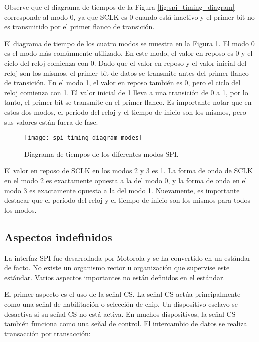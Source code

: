     Observe que el diagrama de tiempos de la Figura \ref{fig:spi_timing_diagram} corresponde al modo 0, ya que SCLK es 0 cuando está inactivo y el primer bit no es transmitido por el primer flanco de transición.

    El diagrama de tiempo de los cuatro modos se muestra en la Figura \ref{fig:spi_timing_diagram_modes}. El modo 0 es el modo más comúnmente utilizado. En este modo, el valor en reposo es 0 y el ciclo del reloj comienza con 0. Dado que el valor en reposo y el valor inicial del reloj son los mismos, el primer bit de datos se transmite antes del primer flanco de transición. En el modo 1, el valor en reposo también es 0, pero el ciclo del reloj comienza con 1. El valor inicial de 1 lleva a una transición de 0 a 1, por lo tanto, el primer bit se transmite en el primer flanco. Es importante notar que en estos dos modos, el período del reloj y el tiempo de inicio son los mismos, pero sus valores están fuera de fase.

    \begin{figure}[!h]
      \centering
      \texttt{[image: spi\_timing\_diagram\_modes]}
      \caption{Diagrama de tiempos de los diferentes modos SPI.}
      \label{fig:spi_timing_diagram_modes}
    \end{figure}

    El valor en reposo de SCLK en los modos 2 y 3 es 1. La forma de onda de SCLK en el modo 2 es exactamente opuesta a la del modo 0, y la forma de onda en el modo 3 es exactamente opuesta a la del modo 1. Nuevamente, es importante destacar que el período del reloj y el tiempo de inicio son los mismos para todos los modos.

    \subsection{Aspectos indefinidos}

    La interfaz SPI fue desarrollada por Motorola y se ha convertido en un estándar de facto. No existe un organismo rector u organización que supervise este estándar. Varios aspectos importantes no están definidos en el estándar.

    El primer aspecto es el uso de la señal CS. La señal CS actúa principalmente como una señal de habilitación o selección de chip. Un dispositivo esclavo se desactiva si su señal CS no está activa. En muchos dispositivos, la señal CS también funciona como una señal de control. El intercambio de datos se realiza transacción por transacción:

